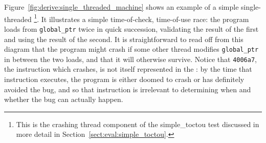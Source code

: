 \begin{figure}
  \caption{}
  \label{fig:derive:single_threaded_machine_both}
\end{figure}

Figure~\ref{fig:derive:single_threaded_machine} shows an example of a
simple single-threaded {\StateMachine}\footnote{This is the crashing
  thread component of the simple\_toctou test discussed in more detail
  in Section~\ref{sect:eval:simple_toctou}.}.  It illustrates a simple
time-of-check, time-of-use race: the program loads from
\verb|global_ptr| twice in quick succession, validating the result of
the first and using the result of the second.  It is straightforward
to read off from this diagram that the program might crash if some
other thread modifies \verb|global_ptr| in between the two loads, and
that it will otherwise survive.  Notice that \verb|4006a7|, the
instruction which crashes, is not itself represented in the
{\StateMachine}: by the time that instruction executes, the program is
either doomed to crash or has definitely avoided the bug, and so that
instruction is irrelevant to determining when and whether the bug can
actually happen.

